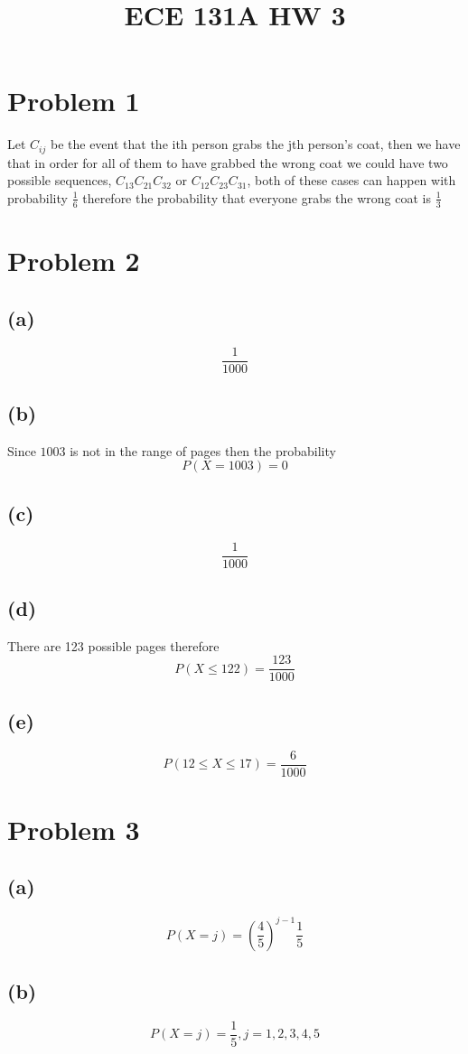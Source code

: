 
\title{ECE 131A HW 3}

\maketitle
\section*{Problem 1}
Let $C_{ij}$ be the event that 
the ith person grabs the jth person's coat, then we have that 
in order for all of them to have grabbed the wrong coat we could
have two possible sequences, 
$C_{13}C_{21}C_{32}$ or $C_{12}C_{23}C_{31}$, both of these cases
can happen with probability $\frac{1}{6}$ therefore the probability
that everyone grabs the wrong coat is $\boxed{\frac{1}{3}}$
\section*{Problem 2}
\subsection*{(a)}
$$\boxed{\frac{1}{1000}}$$
\subsection*{(b)}
Since $1003$ is not in the range of pages
then the probability
$$P(X=1003)=\boxed{0}$$
\subsection*{(c)}
$$\boxed{\frac{1}{1000}}$$
\subsection*{(d)}
There are 123 possible pages
therefore
$$P(X\leq 122)=\boxed{\frac{123}{1000}}$$
\subsection*{(e)}
$$P(12\leq X\leq 17)=\boxed{\frac{6}{1000}}$$
\section*{Problem 3}
\subsection*{(a)}
$$P(X=j)=\left(\frac{4}{5}\right)^{j-1}\frac{1}{5}$$
\subsection*{(b)}
$$P(X=j)=\boxed{\frac{1}{5}, j=1,2,3,4,5}$$

